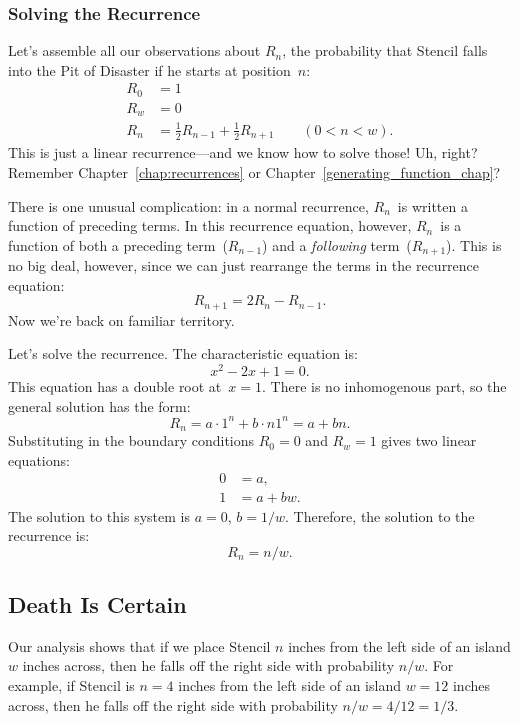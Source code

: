 \subsubsection{Solving the Recurrence}

Let's assemble all our observations about $R_n$, the probability that
Stencil falls into the Pit of Disaster if he starts at position~$n$:
%
\[
\begin{array}{rl}
R_0 & = 1 \\
R_w & = 0 \\
R_n & = \frac{1}{2} R_{n-1} + \frac{1}{2} R_{n+1} \qquad (0 < n < w).
\end{array}
\]
%
This is just a linear recurrence---and we know how to solve those!
Uh, right?  Remember Chapter~\ref{chap:recurrences} or
Chapter~\ref{generating_function_chap}?

There is one unusual complication: in a normal recurrence, $R_n$~is
written a function of preceding terms.  In this recurrence equation,
however, $R_n$~is a function of both a preceding term~($R_{n-1}$) and
a \emph{following} term~($R_{n+1}$).  This is no big deal, however,
since we can just rearrange the terms in the recurrence equation:
%
\[
    R_{n+1} = 2 R_n - R_{n-1}.
\]
%
Now we're back on familiar territory.

Let's solve the recurrence.  The characteristic equation is:
%
\[
    x^2 - 2 x + 1 = 0.
\]
%
This equation has a double root at~$x = 1$.  There is no inhomogenous
part, so the general solution has the form:
%
\[
    R_n = a \cdot 1^n + b \cdot n 1^n = a + b n.
\]
%
Substituting in the boundary conditions $R_0 = 0$ and $R_w = 1$ gives
two linear equations:
%
\begin{align*}
0 & = a, \\
1 & = a + b w.
\end{align*}
%
The solution to this system is $a = 0$, $b = 1 / w$.  Therefore, the
solution to the recurrence is:
%
\[
    R_n = n / w.
\]

\subsection{Death Is Certain}

Our analysis shows that if we place Stencil $n$ inches from the left
side of an island $w$ inches across, then he falls off the right side
with probability $n / w$.  For example, if Stencil is $n = 4$ inches
from the left side of an island $w = 12$ inches across, then he falls
off the right side with probability $n / w = 4 / 12 = 1 / 3$.

